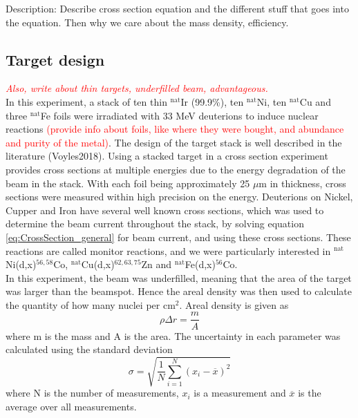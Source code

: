 \documentclass[a4paper,11pt,twoside]{book}
\begin{document}
Description: Describe cross section equation and the different stuff that goes into the equation. Then why we care about the mass density, efficiency. 



\subsection{Target design}
\textit{\textcolor{red}{Also, write about thin targets, underfilled beam, advantageous.}}\\

\noindent 
In this experiment, a stack of ten thin $^{\text{nat}}$Ir (99.9\%), ten $^{\text{nat}}$Ni, ten $^{\text{nat}}$Cu and three $^{\text{nat}}$Fe foils were irradiated with 33 MeV deuterions to induce nuclear reactions  \textcolor{red}{(provide info about foils, like where they were bought, and abundance and purity of the metal)}. The design of the target stack is well described in the literature (Voyles2018). Using a stacked target in a cross section experiment provides cross sections at multiple energies due to the energy degradation of the beam in the stack. With each foil being approximately 25 $\mu$m in thickness, cross sections were measured within high precision on the energy. Deuterions on Nickel, Cupper and Iron have several well known cross sections, which was used to determine the beam current throughout the stack, by solving equation \ref{eq:CrossSection_general} for beam current, and using these cross sections. These reactions are called monitor reactions, and we were particularly interested in $^{\text{nat}}$Ni(d,x)$^{56,58}$Co, $^{\text{nat}}$Cu(d,x)$^{62, 63, 75}$Zn and $^{\text{nat}}$Fe(d,x)$^{56}$Co.  \\ 

\noindent
In this experiment, the beam was underfilled, meaning that the area of the target was larger than the beamspot. Hence the areal density was then used to calculate the quantity of how many nuclei per cm$^2$. Areal density is given as 
\begin{equation}
    \rho \Delta r = \frac{m}{A}
\end{equation}
\noindent
where m is the mass and A is the area. The uncertainty in each parameter was calculated using the standard deviation
\begin{equation}
    \sigma = \sqrt{\frac{1}{N}\sum_{i=1}^N (x_i - \overline{x})^2}
\end{equation}
\noindent
where N is the number of measurements, $x_i$ is a measurement and $\overline{x}$ is the average over all measurements. 
\end{document}
